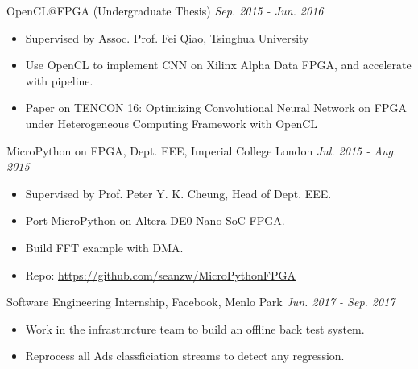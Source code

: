 \documentclass[a4paper]{article}
\newenvironment{changemargin}[2]{%
  \begin{list}{}{%
    \setlength{\topsep}{0pt}%
    \setlength{\leftmargin}{#1}%
    \setlength{\rightmargin}{#2}%
    \setlength{\listparindent}{\parindent}%
    \setlength{\itemindent}{\parindent}%
    \setlength{\parsep}{\parskip}%
  }%
  \item[]}{\end{list}
}
\newenvironment{body} {
	\vspace*{-16pt}
	\begin{changemargin}{-0.5in}{-0.5in}
  }	
	{\end{changemargin}
}
\begin{document}
\begin{body}


	OpenCL@FPGA (Undergraduate Thesis) \hfill \emph{Sep. 2015 - Jun. 2016}
	\begin{itemize}
	\itemsep 0pt
	\item Supervised by Assoc. Prof. Fei Qiao, Tsinghua University
	\item Use OpenCL to implement CNN on Xilinx Alpha Data FPGA, and accelerate with pipeline.
	\item Paper on TENCON 16: Optimizing Convolutional Neural Network on FPGA under Heterogeneous Computing Framework with OpenCL
	\end{itemize}
	\smallskip


	MicroPython on FPGA, Dept. EEE, Imperial College London \hfill \emph{Jul. 2015 - Aug. 2015}
	\begin{itemize}
	\itemsep 0pt
	\item Supervised by Prof. Peter Y. K. Cheung, Head of Dept. EEE.
	\item Port MicroPython on Altera DE0-Nano-SoC FPGA.
	\item Build FFT example with DMA.
	\item Repo: \href{https://github.com/seanzw/MicroPythonFPGA}{https://github.com/seanzw/MicroPythonFPGA}
	\end{itemize}
	\smallskip

	Software Engineering Internship, Facebook, Menlo Park \hfill \emph{Jun. 2017 - Sep. 2017}
	\begin{itemize}
	\itemsep 0pt
	\item Work in the infrasturcture team to build an offline back test system.
	\item Reprocess all Ads classficiation streams to detect any regression.
	\end{itemize}
	\smallskip


\end{body}
\end{document}
